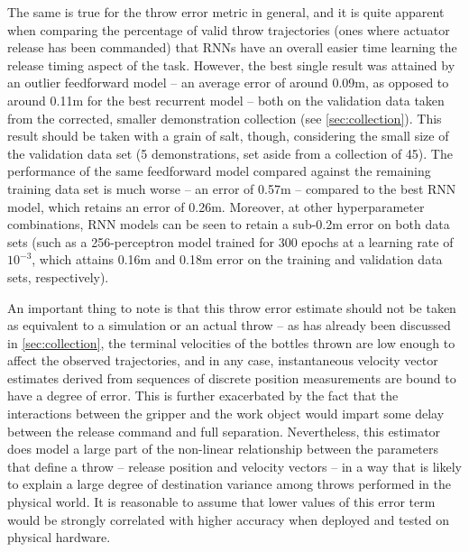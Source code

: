 \documentclass{article}
\begin{document}
The same is true for the throw error metric in general, and it is quite apparent when comparing the percentage of valid throw trajectories (ones where actuator release has been commanded) that RNNs have an overall easier time learning the release timing aspect of the task. However, the best single result was attained by an outlier feedforward model -- an average error of around 0.09m, as opposed to around 0.11m for the best recurrent model -- both on the validation data taken from the corrected, smaller demonstration collection (see \ref{sec:collection}). This result should be taken with a grain of salt, though, considering the small size of the validation data set (5 demonstrations, set aside from a collection of 45). The performance of the same feedforward model compared against the remaining training data set is much worse -- an error of 0.57m -- compared to the best RNN model, which retains an error of 0.26m. Moreover, at other hyperparameter combinations, RNN models can be seen to retain a sub-0.2m error on both data sets (such as a 256-perceptron model trained for 300 epochs at a learning rate of $10^{-3}$, which attains 0.16m and 0.18m error on the training and validation data sets, respectively).

An important thing to note is that this throw error estimate should not be taken as equivalent to a simulation or an actual throw -- as has already been discussed in \ref{sec:collection}, the terminal velocities of the bottles thrown are low enough to affect the observed trajectories, and in any case, instantaneous velocity vector estimates derived from sequences of discrete position measurements are bound to have a degree of error. This is further exacerbated by the fact that the interactions between the gripper and the work object would impart some delay between the release command and full separation. Nevertheless, this estimator does model a large part of the non-linear relationship between the parameters that define a throw -- release position and velocity vectors -- in a way that is likely to explain a large degree of destination variance among throws performed in the physical world. It is reasonable to assume that lower values of this error term would be strongly correlated with higher accuracy when deployed and tested on physical hardware.
\end{document}

